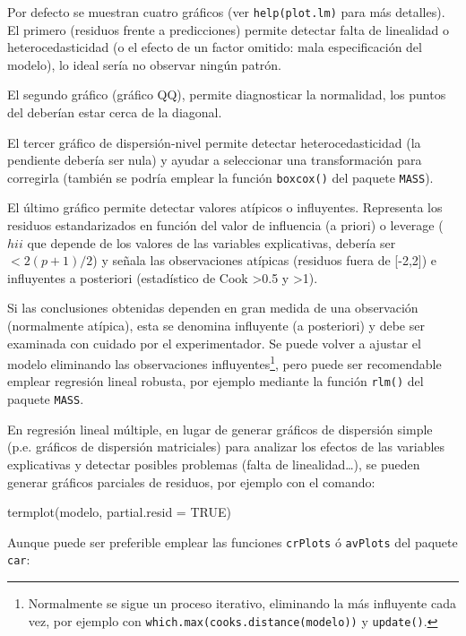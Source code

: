 \documentclass[
]{book}
\newenvironment{Shaded}{\begin{snugshade}}{\end{snugshade}}
\newcommand{\AttributeTok}[1]{\textcolor[rgb]{0.77,0.63,0.00}{#1}}
\newcommand{\ConstantTok}[1]{\textcolor[rgb]{0.00,0.00,0.00}{#1}}
\newcommand{\FunctionTok}[1]{\textcolor[rgb]{0.00,0.00,0.00}{#1}}
\newcommand{\NormalTok}[1]{#1}
\theoremstyle{break}
\theoremstyle{definition}
\theoremstyle{definition}
\theoremstyle{definition}
\theoremstyle{definition}
\theoremstyle{remark}
\begin{document}
Por defecto se muestran cuatro gráficos (ver \texttt{help(plot.lm)} para más detalles).
El primero (residuos frente a predicciones) permite detectar falta de
linealidad o heterocedasticidad (o el efecto de un factor omitido: mala
especificación del modelo), lo ideal sería no observar ningún patrón.

El segundo gráfico (gráfico QQ), permite diagnosticar la normalidad,
los puntos del deberían estar cerca de la diagonal.

El tercer gráfico de dispersión-nivel permite detectar heterocedasticidad (la pendiente debería ser nula) y ayudar a seleccionar una transformación para corregirla (también se podría emplear la función \texttt{boxcox()} del paquete \texttt{MASS}).

El último gráfico permite detectar valores atípicos o influyentes. Representa los residuos estandarizados en función del valor de influencia (a priori) o leverage (\(hii\) que depende de los valores de las variables explicativas, debería ser \(< 2(p+1)/2\)) y señala las observaciones atípicas (residuos fuera de {[}-2,2{]}) e influyentes a posteriori (estadístico de Cook \textgreater0.5 y \textgreater1).

Si las conclusiones obtenidas dependen en gran medida de una
observación (normalmente atípica), esta se denomina influyente (a
posteriori) y debe ser examinada con cuidado por el experimentador.
Se puede volver a ajustar el modelo eliminando las observaciones influyentes\footnote{Normalmente se sigue un proceso iterativo, eliminando la más influyente cada vez, por ejemplo con \texttt{which.max(cooks.distance(modelo))} y \texttt{update()}.},
pero puede ser recomendable emplear regresión lineal robusta,
por ejemplo mediante la función \texttt{rlm()} del paquete \texttt{MASS}.

En regresión lineal múltiple, en lugar de generar gráficos de dispersión simple
(p.e. gráficos de dispersión matriciales) para analizar los efectos de las variables explicativas y
detectar posibles problemas (falta de linealidad\ldots),
se pueden generar gráficos parciales de residuos, por ejemplo con el comando:

\begin{Shaded}
\begin{Highlighting}[]
\FunctionTok{termplot}\NormalTok{(modelo, }\AttributeTok{partial.resid =} \ConstantTok{TRUE}\NormalTok{)}
\end{Highlighting}
\end{Shaded}

Aunque puede ser preferible emplear las funciones \texttt{crPlots} ó \texttt{avPlots} del paquete \texttt{car}:
\end{document}
